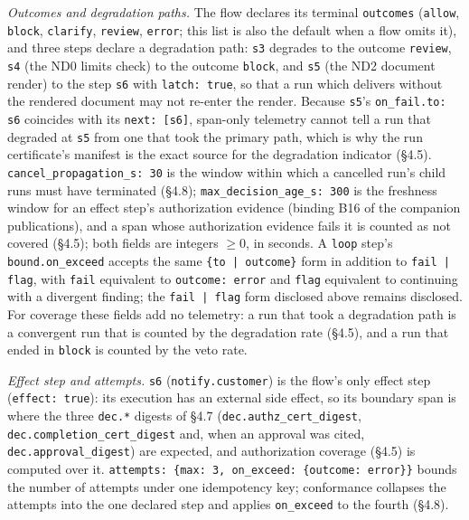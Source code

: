 \documentclass[11pt]{article}
\newcommand{\code}[1]{\texttt{#1}}
\begin{document}
\emph{Outcomes and degradation paths.} The flow declares its terminal \code{outcomes} (\code{allow}, \code{block}, \code{clarify}, \code{review}, \code{error}; this list is also the default when a flow omits it), and three steps declare a degradation path: \code{s3} degrades to the outcome \code{review}, \code{s4} (the ND0 limits check) to the outcome \code{block}, and \code{s5} (the ND2 document render) to the step \code{s6} with \code{latch: true}, so that a run which delivers without the rendered document may not re-enter the render. Because \code{s5}'s \code{on\_fail.to: s6} coincides with its \code{next: [s6]}, span-only telemetry cannot tell a run that degraded at \code{s5} from one that took the primary path, which is why the run certificate's manifest is the exact source for the degradation indicator (\S4.5). \code{cancel\_propagation\_s: 30} is the window within which a cancelled run's child runs must have terminated (\S4.8); \code{max\_decision\_age\_s: 300} is the freshness window for an effect step's authorization evidence (binding B16 of the companion publications), and a span whose authorization evidence fails it is counted as not covered (\S4.5); both fields are integers \(\geq 0\), in seconds. A \code{loop} step's \code{bound.on\_exceed} accepts the same \code{\{to | outcome\}} form in addition to \code{fail | flag}, with \code{fail} equivalent to \code{outcome: error} and \code{flag} equivalent to continuing with a divergent finding; the \code{fail | flag} form disclosed above remains disclosed. For coverage these fields add no telemetry: a run that took a degradation path is a convergent run that is counted by the degradation rate (\S4.5), and a run that ended in \code{block} is counted by the veto rate.

\begin{sloppypar}
\emph{Effect step and attempts.} \code{s6} (\code{notify.customer}) is the flow's only effect step (\code{effect: true}): its execution has an external side effect, so its boundary span is where the three \code{dec.*} digests of \S4.7 (\code{dec.authz\_cert\_digest}, \code{dec.completion\_cert\_digest} and, when an approval was cited, \code{dec.approval\_digest}) are expected, and authorization coverage (\S4.5) is computed over it. \code{attempts: \{max: 3, on\_exceed: \{outcome: error\}\}} bounds the number of attempts under one idempotency key; conformance collapses the attempts into the one declared step and applies \code{on\_exceed} to the fourth (\S4.8).
\end{sloppypar}
\end{document}
